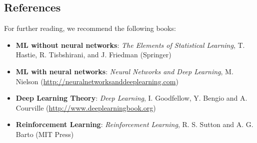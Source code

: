 \subsection{References}
For further reading, we recommend the following books:
\begin{itemize}
	\item {\bf ML without neural networks}: \emph{The Elements of Statistical Learning}, T. Hastie, R. Tisbshirani, and J. Friedman (Springer)
	\item {\bf ML with neural networks}: \emph{Neural Networks and Deep Learning}, M. Nielson (\href{http://neuralnetworksanddeeplearning.com}{http://neuralnetworksanddeeplearning.com})
	\item {\bf Deep Learning Theory}: \emph{Deep Learning}, I. Goodfellow, Y. Bengio and A. Courville (\href{http://www.deeplearningbook.org}{http://www.deeplearningbook.org})
	\item {\bf Reinforcement Learning}: \emph{Reinforcement Learning}, R. S. Sutton and A. G. Barto (MIT Press)
\end{itemize}
